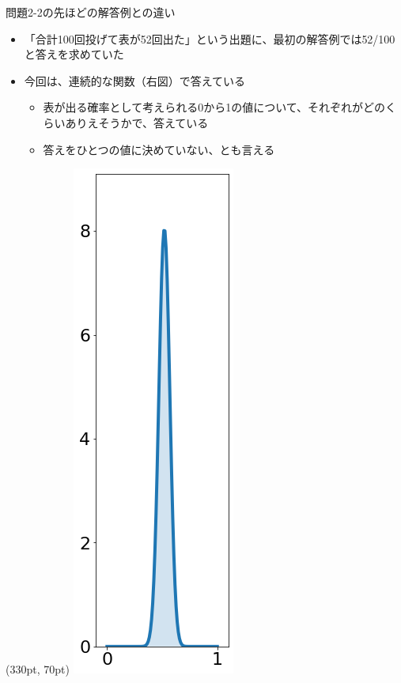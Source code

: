 \documentclass[aspectratio=169,unicode,dvipdfmx,14pt]{beamer}
\begin{document}
\begin{frame}{問題2-2の先ほどの解答例との違い}
\begin{adjustwidth}{0em}{4em}
\begin{itemize}
\item 「合計100回投げて表が52回出た」という出題に、最初の解答例では52/100と答えを求めていた
\item 今回は、連続的な関数（右図）で答えている
\begin{itemize}
\item 表が出る確率として考えられる0から1の値について、それぞれがどのくらいありえそうかで、答えている
\item 答えをひとつの値に決めていない、とも言える
\end{itemize}
\end{itemize}
\end{adjustwidth}
\begin{textblock*}{0.4\linewidth}(330pt, 70pt)
    \centering
    \includegraphics[scale=0.25]{beta_53_49_L.png}
\end{textblock*}
\end{frame}
\end{document}
